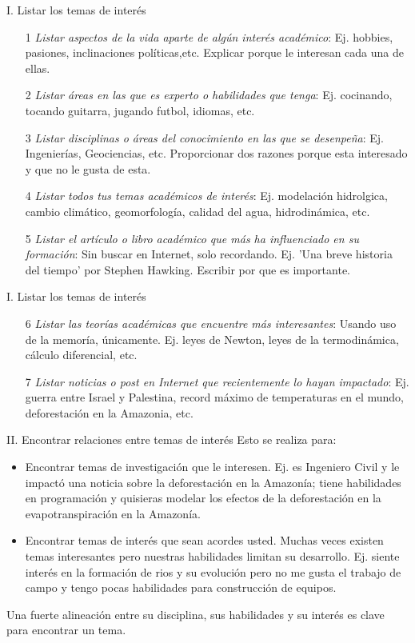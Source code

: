 \documentclass [xcolor=svgnames, t] {beamer}
\begin{document}
\begin{frame}{I. Listar los temas de inter\'es}
\begin{enumerate}
\item[1] \emph{Listar aspectos de la vida aparte de alg\'un inter\'es acad\'emico}: Ej. hobbies, pasiones, inclinaciones pol\'iticas,etc. Explicar porque le interesan cada una de ellas.
\item[2] \emph{Listar \'areas en las que es experto o habilidades que tenga}: Ej. cocinando, tocando guitarra, jugando futbol, idiomas, etc.
\item[3] \emph{Listar disciplinas o \'areas del conocimiento en las que se desenpe\~na}: Ej. Ingenier\'ias, Geociencias, etc. Proporcionar dos razones porque esta interesado y que no le gusta de esta.
\item[4] \emph{Listar todos tus temas acad\'emicos de inter\'es}: Ej. modelaci\'on hidrolgica, cambio clim\'atico, geomorfolog\'ia, calidad del agua, hidrodin\'amica, etc. 
\item[5] \emph{Listar el art\'iculo o libro  acad\'emico que m\'as ha influenciado en su formaci\'on}: Sin buscar en Internet, solo recordando. Ej. 'Una breve historia del tiempo' por Stephen Hawking. Escribir por que es importante.  
\end{enumerate}
\end{frame}

\begin{frame}{I. Listar los temas de inter\'es}
\begin{enumerate}
\item[6] \emph{Listar las teor\'ias acad\'emicas que encuentre m\'as interesantes}: Usando uso de la memor\'ia, \'unicamente. Ej. leyes de Newton, leyes de la termodin\'amica, c\'alculo diferencial, etc. 
\item[7] \emph{Listar noticias o post en Internet que recientemente lo hayan impactado}: Ej. guerra entre Israel y Palestina, record m\'aximo de temperaturas en el mundo, deforestaci\'on en la Amazonia, etc.  
\end{enumerate}
\end{frame}


\begin{frame}{II. Encontrar relaciones entre temas de inter\'es}
Esto se realiza para:
\begin{itemize}
\item Encontrar temas de investigaci\'on que le interesen. Ej. es Ingeniero Civil y le impact\'o una noticia sobre la deforestaci\'on en la Amazon\'ia; tiene habilidades en programaci\'on y quisieras modelar los efectos de la deforestaci\'on en la evapotranspiraci\'on en la Amazon\'ia.
\item Encontrar temas de inter\'es que sean acordes usted. Muchas veces existen temas interesantes pero nuestras habilidades limitan su desarrollo. Ej. siente inter\'es en la formaci\'on de rios y su evoluci\'on pero no me gusta el trabajo de campo y tengo pocas habilidades para construcci\'on de equipos. 
\end{itemize}
\centering
Una fuerte alineaci\'on entre su disciplina, sus habilidades y su inter\'es es clave para encontrar un tema.
\end{frame}
\end{document}

